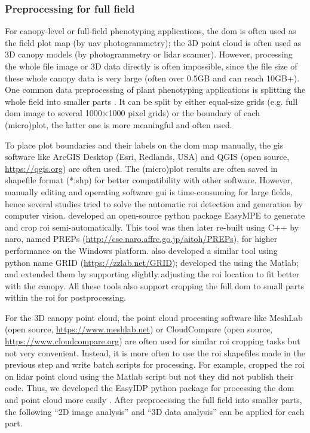 \subsubsection{Preprocessing for full field}

For canopy-level or full-field phenotyping applications, the \gls{dom} is often used as the field plot map (by \gls{uav} photogrammetry); the 3D point cloud is often used as 3D canopy models (by photogrammetry or \gls{lidar} scanner). However, processing the whole file image or 3D data directly is often impossible, since the file size of these whole canopy data is very large (often over 0.5GB and can reach 10GB+). One common data preprocessing of plant phenotyping applications is splitting the whole field into smaller parts \citep{wang_easyidp_2021}. It can be split by either equal-size grids (e.g. full \gls{dom} image to several 1000$\times$1000 pixel grids) or the boundary of each (micro)plot, the latter one is more meaningful and often used.

To place plot boundaries and their labels on the \gls{dom} map manually, the \gls{gis} software like ArcGIS Desktop (Esri, Redlands, USA) and QGIS (open source, \url{https://qgis.org}) are often used. The (micro)plot results are often saved in shapefile format (*.shp) for better compatibility with other software. However, manually editing and operating software \gls{gui} is time-consuming for large fields, hence several studies tried to solve the automatic \gls{roi} detection and generation by computer vision. \citep{tresch_easympe_2019} developed an open-source python package EasyMPE to generate and crop \gls{roi} semi-automatically. This tool was then later re-built using C++ by \gls{naro}, named PREPs (\url{http://cse.naro.affrc.go.jp/aitoh/PREPs}), for higher performance on the Windows platform. \citet{chen_grid_2020} also developed a similar tool using python name GRID (\url{https://zzlab.net/GRID}); \citet{mortensen_drone_2019} developed the using the Matlab; and \citep{sara_automatic_2021} extended them by supporting slightly adjusting the \gls{roi} location to fit better with the canopy. All these tools also support cropping the full \gls{dom} to small parts within the \gls{roi} for postprocessing.

For the 3D canopy point cloud, the point cloud processing software like MeshLab (open source, \url{https://www.meshlab.net}) or CloudCompare (open source, \url{https://www.cloudcompare.org}) are often used for similar \gls{roi} cropping tasks but not very convenient. Instead, it is more often to use the \gls{roi} shapefiles made in the previous step and write batch scripts for processing. For example, \citet{sun_field_2018} cropped the \gls{roi} on \gls{lidar} point cloud using the Matlab script but not they did not publish their code. Thus, we developed the EasyIDP python package for processing the \gls{dom} and point cloud more easily \citep{wang_easyidp_2021}. After preprocessing the full field into smaller parts, the following ``2D image analysis'' and ``3D data analysis'' can be applied for each part.


